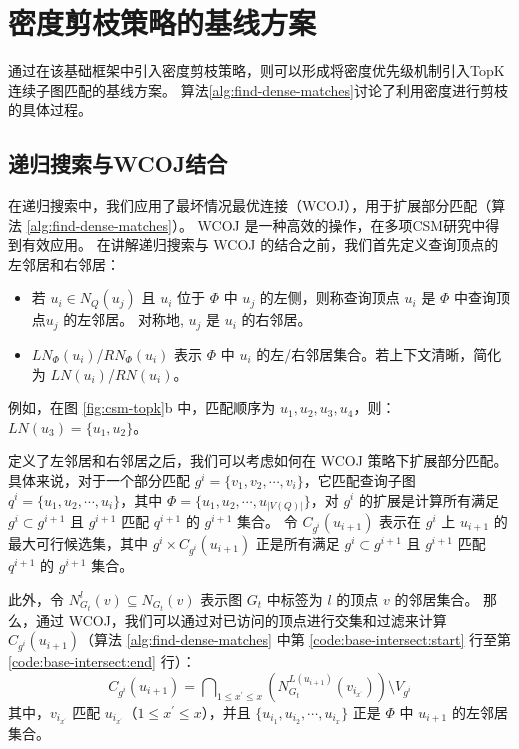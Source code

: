 \section{密度剪枝策略的基线方案}
\label{ch3:wegiht-prune-baseline}
通过在该基础框架中引入密度剪枝策略，则可以形成将密度优先级机制引入TopK连续子图匹配的基线方案。
算法\ref{alg:find-dense-matches}讨论了利用密度进行剪枝的具体过程。
\subsection{递归搜索与WCOJ结合}

在递归搜索中，我们应用了最坏情况最优连接（WCOJ）\cite{wcoj-generic-join-DBLP:journals/sigmod/NgoRR13}，用于扩展部分匹配（算法 \ref{alg:find-dense-matches}）。
WCOJ 是一种高效的操作，在多项CSM研究中得到有效应用\cite{csm-graphflow-DBLP:conf/sigmod/KankanamgeSMCS17,csm-graphflowpp-DBLP:journals/tods/MhedhbiKS21,csm-survey:DBLP:journals/pvldb/SunSLH22}。
在讲解递归搜索与 WCOJ 的结合之前，我们首先定义查询顶点的左邻居和右邻居：
\begin{itemize}
    \item 若 $u_i \in N_Q(u_j)$ 且 $u_i$ 位于 $\Phi$ 中 $u_j$ 的左侧，则称查询顶点 $u_i$ 是 $\Phi$ 中查询顶点$u_j$ 的左邻居。
    对称地, $u_j$ 是 $u_i$ 的右邻居。
    \item $LN_{\Phi}(u_i)$/$RN_{\Phi}(u_i)$ 表示 $\Phi$ 中 $u_i$ 的左/右邻居集合。若上下文清晰，简化为 $LN(u_i)$/$RN(u_i)$。
\end{itemize}   

例如，在图 \ref{fig:csm-topk}b 中，匹配顺序为 ${u_1, u_2, u_3, u_4}$，则：$LN(u_3) = \{u_1, u_2\}$。

定义了左邻居和右邻居之后，我们可以考虑如何在 WCOJ 策略下扩展部分匹配。
具体来说，对于一个部分匹配 $g^i = \{v_1, v_2, \cdots, v_i\}$，它匹配查询子图 $q^i = \{u_1, u_2, \cdots, u_i\}$，其中 $\Phi = \{u_1, u_2, \cdots, u_{|V(Q)|}\}$，对 $g^i$ 的扩展是计算所有满足 $g^i \subset g^{i+1}$ 且 $g^{i+1}$ 匹配 $q^{i+1}$ 的 $g^{i+1}$ 集合。
令 $C_{g^{i}}(u_{i+1})$ 表示在 $g^i$ 上 $u_{i+1}$ 的最大可行候选集，其中 $g^i \times C_{g^{i}}(u_{i+1})$ 正是所有满足 $g^i \subset g^{i+1}$ 且 $g^{i+1}$ 匹配 $q^{i+1}$ 的 $g^{i+1}$ 集合。

此外，令 $N_{G_t}^l(v) \subseteq N_{G_t}(v)$ 表示图 $G_t$ 中标签为 $l$ 的顶点 $v$ 的邻居集合。
那么，通过 WCOJ，我们可以通过对已访问的顶点进行交集和过滤来计算 $C_{g^{i}}(u_{i+1})$（算法 \ref{alg:find-dense-matches} 中第 \ref{code:base-intersect:start} 行至第 \ref{code:base-intersect:end} 行）：
\begin{equation} \label{equation:wcoj-intersection}
    C_{g^{i}}(u_{i+1}) = \bigcap\nolimits_{1\leq x^\prime\leq x} \left(  N_{G_t}^{L(u_{i+1})}(v_{i_{x^\prime}}) \right)  \setminus V_{g^i}
\end{equation}
其中，$v_{i_{x^\prime}}$ 匹配 $u_{i_{x^\prime}}$（$1 \leq x^\prime \leq x$），并且 $\{u_{i_1}, u_{i_2}, \cdots, u_{i_x}\}$ 正是 $\Phi$ 中 $u_{i+1}$ 的左邻居集合。

